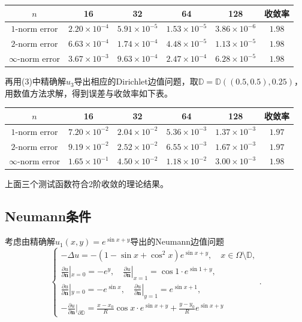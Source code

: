 \documentclass[lang=cn,11pt,a4paper]{elegantpaper}
\begin{document}
\begin{table}[H]
  \centering
  \begin{tabular}{c|cccc|c}
  \textbf{$n$}        & 16                   & 32                   & 64                   & 128                  & 收敛率 \\ \hline
  $1$-norm error      & $2.20\times 10^{-4}$ & $5.91\times 10^{-5}$ & $1.53\times 10^{-5}$ & $3.86\times 10^{-6}$ & $1.98$\\
  $2$-norm error      & $6.63\times 10^{-4}$ & $1.74\times 10^{-4}$ & $4.48\times 10^{-5}$ & $1.13\times 10^{-5}$ & $1.98$\\
  $\infty$-norm error & $3.67\times 10^{-3}$ & $9.63\times 10^{-4}$ & $2.47\times 10^{-4}$ & $6.28\times 10^{-5}$ & $1.98$
  \end{tabular}
\end{table}

再用(3)中精确解$u_3$导出相应的Dirichlet边值问题，取$\mathbb{D}=\mathbb{D}((0.5,0.5),0.25)$，用数值方法求解，得到误差与收敛率如下表。

\begin{table}[H]
  \centering
  \begin{tabular}{c|cccc|c}
  \textbf{$n$}        & 16                   & 32                   & 64                   & 128                  & 收敛率 \\ \hline
  $1$-norm error      & $7.20\times 10^{-2}$ & $2.04\times 10^{-2}$ & $5.36\times 10^{-3}$ & $1.37\times 10^{-3}$ & $1.97$\\
  $2$-norm error      & $9.19\times 10^{-2}$ & $2.52\times 10^{-2}$ & $6.55\times 10^{-3}$ & $1.67\times 10^{-3}$ & $1.97$\\
  $\infty$-norm error & $1.65\times 10^{-1}$ & $4.50\times 10^{-2}$ & $1.18\times 10^{-2}$ & $3.00\times 10^{-3}$ & $1.98$
  \end{tabular}
\end{table}

上面三个测试函数符合2阶收敛的理论结果。

\subsection{Neumann条件}

考虑由精确解$u_1(x,y)=e^{\sin x+y}$导出的Neumann边值问题
\begin{equation}
  \left\{
    \begin{array}{l}
      -\Delta u = -(1-\sin x+\cos^2 x)e^{\sin x + y},\quad x\in\Omega\setminus\mathbb{D}, \\
      \frac{\partial u}{\partial \mathbf{n}}|_{x=0}=-e^{y}, \quad \frac{\partial u}{\partial \mathbf{n}}|_{x=1}=\cos 1 \cdot e^{\sin 1 + y},\\
      \frac{\partial u}{\partial \mathbf{n}}|_{y=0}=-e^{\sin x}, \quad \frac{\partial u}{\partial \mathbf{n}}|_{y=1}=e^{\sin x+1},\\
      -\frac{\partial u}{\partial \mathbf{n}}|_{\partial \mathbb{D}}=\frac{x-x_0}{R}\cos x \cdot e^{\sin x+y}+\frac{y-y_0}{R}e^{\sin x +y}
    \end{array}
  \right. .
\end{equation}
\end{document}
